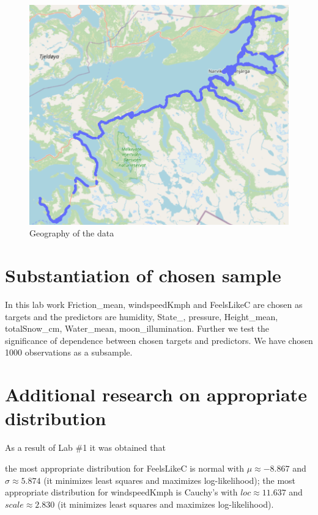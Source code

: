 \documentclass[12pt, bachelor, substylefile = algo_title.rtx]{disser}
\theoremstyle{definition}
\begin{document}
\begin{figure}[!h]
\centering
   \begin{minipage}{0.7\textwidth}
     \includegraphics[width=\linewidth]{geography}
   \end{minipage}
\caption{Geography of the data}
\label{fig: 1}
\end{figure}

\section{Substantiation of chosen sample}
In this lab work Friction\_mean, windspeedKmph and FeelsLikeC are chosen as targets and the predictors  are humidity, State\_, pressure, Height\_mean, totalSnow\_cm, Water\_mean, moon\_illumination. Further we test the significance of dependence between chosen targets and predictors. We have chosen 1000 observations as a subsample.

\section{Additional research on appropriate distribution}
As a result of Lab \#1 it was obtained that
\begin{outline}
\1 the most appropriate distribution for FeelsLikeC is normal with $\mu \approx -8.867$ and $\sigma \approx 5.874$ (it minimizes least squares and maximizes log-likelihood);
\1 the most appropriate distribution for windspeedKmph is Cauchy's with $loc \approx 11.637$ and $scale \approx 2.830$ (it minimizes least squares and maximizes log-likelihood).
\end{outline} 
\end{document}
